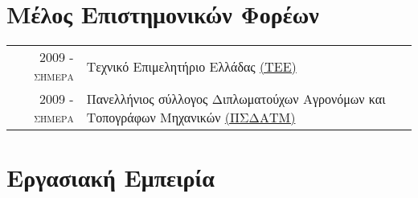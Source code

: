\documentclass[a4paper,10pt]{article} %
\begin{document}
\section{Μέλος Επιστημονικών Φορέων}
\begin{longtable}{rp{13cm}}
\textsc{2009 - σήμερα} & Τεχνικό Επιμελητήριο Ελλάδας \href{http://web.tee.gr/}{(ΤΕΕ)}\\
\textsc{2009 - σήμερα} & Πανελλήνιος σύλλογος Διπλωματούχων Αγρονόμων και Τοπογράφων Μηχανικών \href{http://www.psdatm.gr/}{(ΠΣΔΑΤΜ)}\\
\end{longtable}
\medskip


\section{Εργασιακή Εμπειρία}
\end{document}
